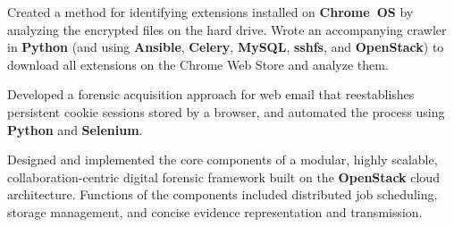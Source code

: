 


\begin{rExperience}


        \item Created a method for identifying extensions installed on \textbf{Chrome~OS} by analyzing the encrypted
          files on the hard drive. Wrote an accompanying crawler in \textbf{Python} (and using \textbf{Ansible},
          \textbf{Celery}, \textbf{MySQL}, \textbf{sshfs}, and \textbf{OpenStack}) to download all extensions on the
          Chrome Web Store and analyze them.


        \item Developed a forensic acquisition approach for web email that reestablishes persistent cookie sessions
          stored by a browser, and automated the process using \textbf{Python} and \textbf{Selenium}.

        \item Designed and implemented the core components of a modular, highly scalable, collaboration-centric digital
          forensic framework built on the \textbf{OpenStack} cloud architecture. Functions of the components included
          distributed job scheduling, storage management, and concise evidence representation and
          transmission.


\end{rExperience}
